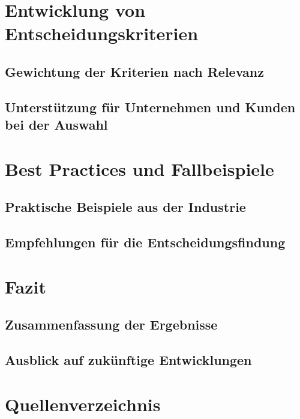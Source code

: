 \documentclass[12pt,bibtotoc]{article}
\newcounter{romanBeginningEnd} %
\begin{document}
	\section{Entwicklung von Entscheidungskriterien}
		\subsection{Gewichtung der Kriterien nach Relevanz}
		\subsection{Unterstützung für Unternehmen und Kunden bei der Auswahl}

	\section{Best Practices und Fallbeispiele}
		\subsection{Praktische Beispiele aus der Industrie}
		\subsection{Empfehlungen für die Entscheidungsfindung}

	\section{Fazit}
		\subsection{Zusammenfassung der Ergebnisse}
		\subsection{Ausblick auf zukünftige Entwicklungen}




	
	
	\newpage
	\setcounter{page}{\theromanBeginningEnd} %
	\setcounter{secnumdepth}{0} %
	\section{Quellenverzeichnis}
	\setcounter{secnumdepth}{3} %
	\printbibliography[heading=none]
	\newpage
	\appendix
	\clearpage
\end{document}
